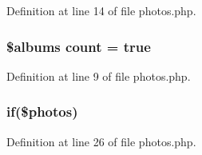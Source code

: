 Definition at line 14 of file photos.\+php.

\subsubsection[{\texorpdfstring{count}{count}}]{\setlength{\rightskip}{0pt plus 5cm}\$albums count = true}\hypertarget{photos_2pages_2photos_8php_a364678aa3bd05301b3d1b8650653cf48}{}\label{photos_2pages_2photos_8php_a364678aa3bd05301b3d1b8650653cf48}


Definition at line 9 of file photos.\+php.

\subsubsection[{\texorpdfstring{if}{if}}]{\setlength{\rightskip}{0pt plus 5cm}if(\$photos)}\hypertarget{photos_2pages_2photos_8php_a866f96068cd497b122fcd4efd2ebfff4}{}\label{photos_2pages_2photos_8php_a866f96068cd497b122fcd4efd2ebfff4}


Definition at line 26 of file photos.\+php.


